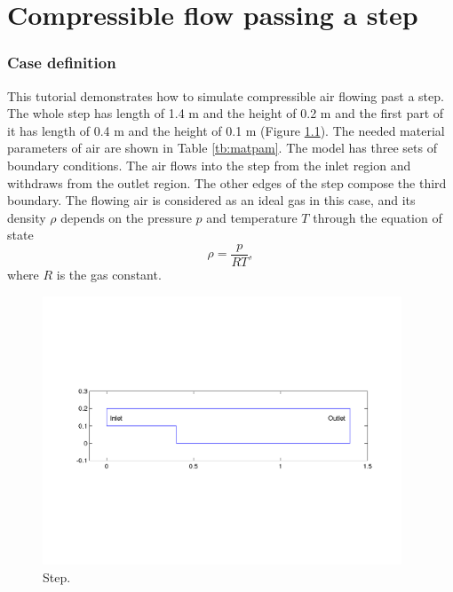 \chapter{Compressible flow passing a step}


\subsection*{Case definition}

This tutorial demonstrates how to simulate compressible air flowing past a step. The whole step has length of 1.4 m and the height of 0.2 m and the first part of it has length of 0.4 m and the height of 0.1 m (Figure \ref{fg:step_geometry}). The needed material parameters of air are shown in Table \ref{tb:matpam}. 
The model has three sets of boundary conditions.
The air flows into the step from the inlet region and withdraws from the outlet region. The other edges of the step compose the third boundary. The flowing air is considered as an ideal gas in this case, and its density $\rho$  depends on the pressure $p$ and temperature $T$ through the equation of state
\begin{displaymath}
\rho = \frac{p}{RT},
\end{displaymath}
where $R$ is the gas constant.

\begin{figure}[h]
\centering
\includegraphics[height=80mm]{step_geometry.png}
\caption{Step.}\label{fg:step_geometry}
\end{figure}

